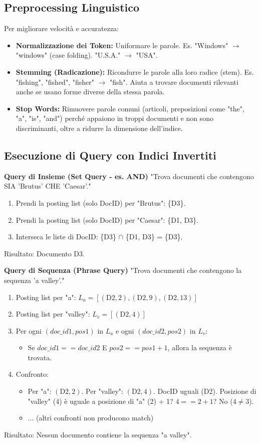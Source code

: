 \subsection{Preprocessing Linguistico}
Per migliorare velocità e accuratezza:
\begin{itemize}
    \item \textbf{Normalizzazione dei Token:} Uniformare le parole. Es. "Windows" $\rightarrow$ "windows" (case folding). "U.S.A." $\rightarrow$ "USA".
    \item \textbf{Stemming (Radicazione):} Ricondurre le parole alla loro radice (stem). Es. "fishing", "fished", "fisher" $\rightarrow$ "fish". Aiuta a trovare documenti rilevanti anche se usano forme diverse della stessa parola.
    \item \textbf{Stop Words:} Rimuovere parole comuni (articoli, preposizioni come "the", "a", "is", "and") perché appaiono in troppi documenti e non sono discriminanti, oltre a ridurre la dimensione dell'indice.
\end{itemize}

\subsection{Esecuzione di Query con Indici Invertiti}

\textbf{Query di Insieme (Set Query - es. AND)}
"Trova documenti che contengono SIA 'Brutus' CHE 'Caesar'."
\begin{enumerate}
    \item Prendi la posting list (solo DocID) per "Brutus": \{D3\}.
    \item Prendi la posting list (solo DocID) per "Caesar": \{D1, D3\}.
    \item Interseca le liste di DocID: \{D3\} $\cap$ \{D1, D3\} = \{D3\}.
\end{enumerate}
Risultato: Documento D3.

\textbf{Query di Sequenza (Phrase Query)}
"Trova documenti che contengono la sequenza 'a valley'."
\begin{enumerate}
    \item Posting list per "a": $L_a = [(\text{D2},2), (\text{D2},9), (\text{D2},13)]$
    \item Posting list per "valley": $L_v = [(\text{D2},4)]$
    \item Per ogni $(doc\_id1, pos1)$ in $L_a$ e ogni $(doc\_id2, pos2)$ in $L_v$:
    \begin{itemize}
        \item Se $doc\_id1 == doc\_id2$ E $pos2 == pos1 + 1$, allora la sequenza è trovata.
    \end{itemize}
    \item Confronto:
    \begin{itemize}
        \item Per "a": $(\text{D2},2)$. Per "valley": $(\text{D2},4)$. DocID uguali (D2). Posizione di "valley" (4) è uguale a posizione di "a" (2) + 1? $4 == 2+1$? No ($4 \ne 3$).
        \item ... (altri confronti non producono match)
    \end{itemize}
\end{enumerate}
Risultato: Nessun documento contiene la sequenza "a valley".

